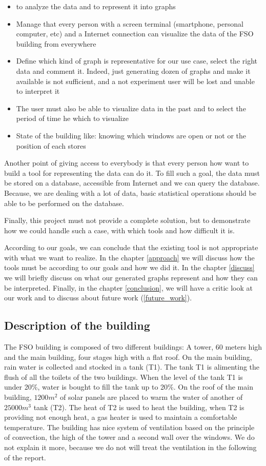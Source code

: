 \documentclass{acm_proc_article-sp}
\begin{document}
\begin{itemize}
\item to analyze the data and to represent it into graphs
\item Manage that every person with a screen terminal (smartphone, personal computer, etc) and a Internet connection can visualize the data of the FSO building from everywhere
\item Define which kind of graph is representative for our use case, select the right data and comment it. Indeed, just generating dozen of graphs and make it available is not sufficient, and a not experiment user will be lost and unable to interpret it
\item The user must also be able to visualize data in the past and to select the period of time he which to visualize
\item State of the building like: knowing which windows are open or not or the position of each stores
\end{itemize}

Another point of giving access to everybody is that every person how want to build a tool for representing the data can do it. To fill such a goal, the data must be stored on a database, accessible from Internet and we can query the database. Because, we are dealing with a lot of data, basic statistical operations should be able to be performed on the database.

Finally, this project must not provide a complete solution, but to demonstrate how we could handle such a case, with which tools and how difficult it is.

According to our goals, we can conclude that the existing tool is not appropriate with what we want to realize. In the chapter \ref{approach} we will discuss how the tools must be according to our goals and how we did it. In the chapter \ref{discuss} we will briefly discuss on what our generated graphs represent and how they can be interpreted. Finally, in the chapter \ref{conclusion}, we will have a critic look at our work and to discuss about future work (\ref{future_work}).

\subsection{Description of the building}
The FSO building is composed of two different buildings: A tower, 60 meters high and the main building, four stages high with a flat roof. On the main building, rain water is collected and stocked in a tank (T1). The tank T1 is alimenting the flush of all the toilets of the two buildings. When the level of the tank T1 is under 20\%, water is bought to fill the tank up to 20\%. On the roof of the main building, $1200 m^2$ of solar panels are placed to warm the water of another of $25000m^3$ tank (T2). The heat of T2 is used to heat the building, when T2 is providing not enough heat, a gas heater is used to maintain a comfortable temperature. The building has nice system of ventilation based on the principle of convection, the high of the tower and a second wall over the windows. We do not explain it more, because we do not will treat the ventilation in the following of the report.
\end{document}
